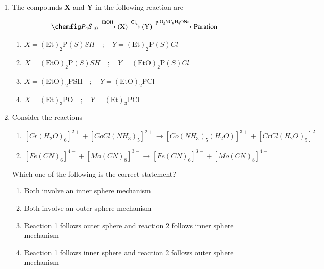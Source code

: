 \documentclass[journal,12pt,onecolumn]{IEEEtran}
\theoremstyle{remark}
\begin{document}
\begin{enumerate}
\item The compounds \textbf{X} and \textbf{Y} in the following reaction are
\hfill{}

\[
\chemfig P_4S_{10} \xrightarrow{\ce{EtOH}} \text{(X)}
\xrightarrow{\ce{Cl_2}} \text{(Y)}
 \xrightarrow{\ce{p-O_2NC_6H_4ONa}} \text{Paration} 
\]


\begin{multicols}{2}
\begin{enumerate}[leftmargin=*, labelsep=1em]
     \item   $X = (\mathrm{Et})_2\mathrm{P}(S)SH \quad ; \quad Y = (\mathrm{Et})_2\mathrm{P}(S)Cl$
     \item   $X = (\mathrm{EtO})_2\mathrm{P}(S)SH \quad ; \quad Y = (\mathrm{EtO})_2\mathrm{P}(S)Cl$
     \item   $X = (\mathrm{EtO})_2\mathrm{PSH} \quad ; \quad Y = (\mathrm{EtO})_2\mathrm{PCl}$
     \item   $X = (\mathrm{Et})_3\mathrm{PO} \quad ; \quad Y = (\mathrm{Et})_3\mathrm{PCl}$
\end{enumerate}
\end{multicols}
 

\item Consider the reactions \hfill{}

\begin{enumerate}
\item \([Cr(H_2O)_6]^{2+} + [CoCl(NH_3)_5]^{2+} \rightarrow [Co(NH_3)_5(H_2O)]^{3+} + [CrCl(H_2O)_5]^{2+}\)
\item \([Fe(CN)_6]^{4-} + [Mo(CN)_8]^{3-} \rightarrow [Fe(CN)_6]^{3-} + [Mo(CN)_8]^{4-}\)
\end{enumerate}

Which one of the following is the correct statement?  

\begin{multicols}{2}
\begin{enumerate} 
 \item   Both involve an inner sphere mechanism  
 \item   Both involve an outer sphere mechanism  
 
 \item   Reaction 1 follows outer sphere and reaction 2 follows inner sphere mechanism  
 \item   Reaction 1 follows inner sphere and reaction 2 follows outer sphere mechanism  
\end{enumerate}
\end{multicols}
  


\end{enumerate}
\end{document}

